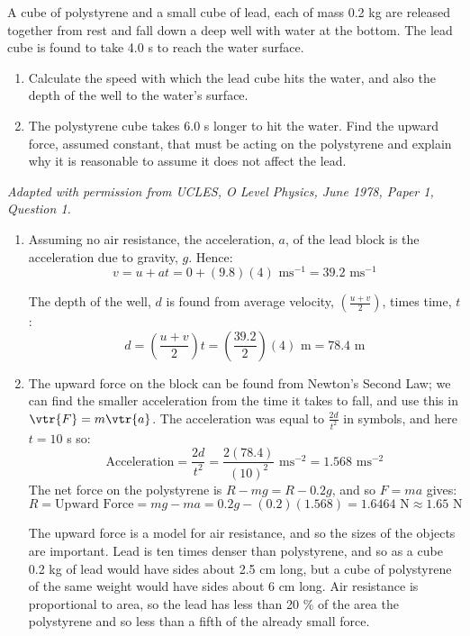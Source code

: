 \begin{problem}[O1978PIIQ1a]
{A cube of polystyrene and a small cube of lead, each of mass 0.2 kg are released together from rest and fall down a deep well with water at the bottom. The lead cube is found to take 4.0 s to reach the water surface.
\begin{enumerate}
	\item Calculate the speed with which the lead cube hits the water, and also the depth of the well to the water's surface.
	\item The polystyrene cube takes 6.0 s longer to hit the water. Find the upward force, assumed constant, that must be acting on the polystyrene and explain why it is reasonable to assume it does not affect the lead.
\end{enumerate}
}
{\textit{Adapted with permission from UCLES, O Level Physics, June 1978, Paper 1, Question 1.}}
{\begin{enumerate}
\item Assuming no air resistance, the acceleration, $a$, of the lead block is the acceleration due to gravity, $g$. Hence:
\begin{equation*}v = u + at = 0 + (9.8)(4) \textrm{ ms}^{-1} = 39.2 \textrm{ ms}^{-1} \end{equation*}

The depth of the well, $d$ is found from average velocity, $\left(\frac{u + v}{2}\right)$, times time, $t$:
\begin{equation*} d = \left(\frac{u + v}{2}\right)t = \left(\frac{39.2}{2}\right)(4) \textrm{ m} = 78.4 \textrm{ m} \end{equation*}
\item The upward force on the block can be found from Newton's Second Law; we can find the smaller acceleration from the time it takes to fall, and use this in $\vtr{F} = m\vtr{a}$. The acceleration was equal to $\frac{2d}{t^{2}}$ in symbols, and here $t = 10$ s so:
\begin{equation*} \textrm{Acceleration} = \frac{2d}{t^{2}} = \frac{2(78.4)}{(10)^{2}} \textrm{ ms}^{-2} = 1.568 \textrm{ ms}^{-2} \end{equation*}
The net force on the polystyrene is $R - mg = R - 0.2g$, and so $F = ma$ gives:
\begin{equation*} R = \textrm{Upward Force} = mg - ma = 0.2g - (0.2)(1.568) = 1.6464 \textrm{ N} \approx 1.65 \textrm{ N} \end{equation*}

The upward force is a model for air resistance, and so the sizes of the objects are important. Lead is ten times denser than polystyrene, and so as a cube 0.2 kg of lead would have sides about 2.5 cm long, but a cube of polystyrene of the same weight would have sides about 6 cm long. Air resistance is proportional to area, so the lead has less than 20 \% of the area the polystyrene and so less than a fifth of the already small force.
\end{enumerate}
}
\end{problem}